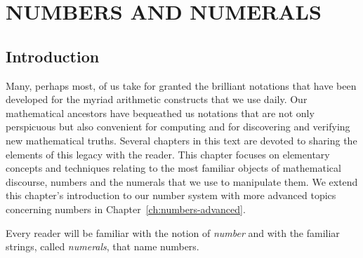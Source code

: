 
\chapter{NUMBERS AND NUMERALS}
\label{ch:numbers-numerals}

\section{Introduction}

Many, perhaps most, of us take for granted the brilliant notations
that have been developed for the myriad arithmetic constructs that we
use daily.  Our mathematical ancestors have bequeathed us notations
that are not only perspicuous but also convenient for computing and
for discovering and verifying new mathematical truths.  Several
chapters in this text are devoted to sharing the elements of this
legacy with the reader.  This chapter focuses on elementary concepts
and techniques relating to the most familiar objects of mathematical
discourse, numbers and the numerals that we use to manipulate them.
We extend this chapter's introduction to our number system with more
advanced topics concerning numbers in
Chapter~\ref{ch:numbers-advanced}.

Every reader will be familiar with the notion of {\it number} and with
the familiar strings, called {\it numerals}, that name numbers.
\medskip

\noindent {}
\bigskip

